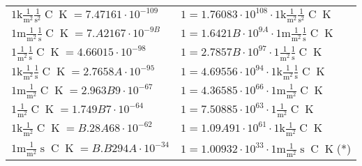 \begin{center}
\begin{longtable}{l l}
{\color{gray}$1 \bm{\mathrm{ k}}\frac1{\operatorname{m}^2}\frac1{\operatorname{s}^2}{\operatorname{C}}{\operatorname{K}} = 7.47161\cdot10^{-109} $}   & {\color{gray}$ 1 = 1.76083\cdot10^{108} \cdot 1 \bm{\mathrm{ k}}\frac1{\operatorname{m}^2}\frac1{\operatorname{s}^2}{\operatorname{C}}{\operatorname{K}}$}  \\
{\color{gray}$1 \bm{\mathrm{ m}}\frac1{\operatorname{m}^2}\frac1{\operatorname{s}}{\operatorname{C}}{\operatorname{K}} = 7.A2167\cdot10^{-9B} $}   & {\color{gray}$ 1 = 1.6421B\cdot10^{9A} \cdot 1 \bm{\mathrm{ m}}\frac1{\operatorname{m}^2}\frac1{\operatorname{s}}{\operatorname{C}}{\operatorname{K}}$}  \\
{\color{black}$1 \bm{\mathrm{ }}\frac1{\operatorname{m}^2}\frac1{\operatorname{s}}{\operatorname{C}}{\operatorname{K}} = 4.66015\cdot10^{-98} $}   & {\color{black}$ 1 = 2.7857B\cdot10^{97} \cdot 1 \bm{\mathrm{ }}\frac1{\operatorname{m}^2}\frac1{\operatorname{s}}{\operatorname{C}}{\operatorname{K}}$}  \\
{\color{gray}$1 \bm{\mathrm{ k}}\frac1{\operatorname{m}^2}\frac1{\operatorname{s}}{\operatorname{C}}{\operatorname{K}} = 2.7658A\cdot10^{-95} $}   & {\color{gray}$ 1 = 4.69556\cdot10^{94} \cdot 1 \bm{\mathrm{ k}}\frac1{\operatorname{m}^2}\frac1{\operatorname{s}}{\operatorname{C}}{\operatorname{K}}$}  \\
{\color{gray}$1 \bm{\mathrm{ m}}\frac1{\operatorname{m}^2}{}{\operatorname{C}}{\operatorname{K}} = 2.963B9\cdot10^{-67} $}   & {\color{gray}$ 1 = 4.36585\cdot10^{66} \cdot 1 \bm{\mathrm{ m}}\frac1{\operatorname{m}^2}{}{\operatorname{C}}{\operatorname{K}}$}  \\
{\color{black}$1 \bm{\mathrm{ }}\frac1{\operatorname{m}^2}{}{\operatorname{C}}{\operatorname{K}} = 1.749B7\cdot10^{-64} $}   & {\color{black}$ 1 = 7.50885\cdot10^{63} \cdot 1 \bm{\mathrm{ }}\frac1{\operatorname{m}^2}{}{\operatorname{C}}{\operatorname{K}}$}  \\
{\color{gray}$1 \bm{\mathrm{ k}}\frac1{\operatorname{m}^2}{}{\operatorname{C}}{\operatorname{K}} = B.28A68\cdot10^{-62} $}   & {\color{gray}$ 1 = 1.09A91\cdot10^{61} \cdot 1 \bm{\mathrm{ k}}\frac1{\operatorname{m}^2}{}{\operatorname{C}}{\operatorname{K}}$}  \\
{\color{gray}$1 \bm{\mathrm{ m}}\frac1{\operatorname{m}^2}{\operatorname{s}}{\operatorname{C}}{\operatorname{K}} = B.B294A\cdot10^{-34} $}   & {\color{gray}$ 1 = 1.00932\cdot10^{33} \cdot 1 \bm{\mathrm{ m}}\frac1{\operatorname{m}^2}{\operatorname{s}}{\operatorname{C}}{\operatorname{K}}$}\quad(*)\\

\end{longtable}
\end{center}
